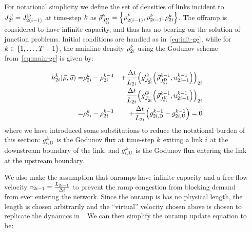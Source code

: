 			For notational simplicity we define the set of densities of links
			incident to $\jup{2\link}=\jdown{2\left(\link-1\right)}$ at time-step
			$k$ as $\juncstate{\jup{2\link}}{\tind}=\left\{ \discrete{2\left(\link-1\right)}{\tind},\discrete{2i-1}{\tind},\discrete{2\link}{\tind}\right\} $.
			The offramp is considered to have infinite capacity, and thus has
			no bearing on the solution of junction problems. Initial conditions
			are handled as in~\eqref{eq:init-ge}, while for $k\in\intrange 1{\ntime-1}$,
			the mainline density $\rho_{2i}^{k}$ using the Godunov
			scheme from~\eqref{eq:main-ge} is given by:
						
			\begin{eqnarray}
				\syseq_{2\link}^{\tind}(\state,\control)= & \discrete{2\link}{\tind}-\discrete{2\link}{\tind-1} & +\dfrac{\Delta t}{\length_{2\link}}\left(\god_{\jdown{2\link}}\left(\juncstate{\jdown{2\link}}{\tind-1},\ramp_{2\link+1}^{\tind-1}\right)\right)_{2\link}\label{eq:rho-update}\\
				&  & -\dfrac{\Delta t}{\length_{2\link}}\left(\god_{\jup{2\link}}\left(\juncstate{\jup{2\link}}{\tind-1},\ramp_{2\link-1}^{\tind-1}\right)\right)_{2\link}\nonumber \\
				= & \discrete{2\link}{\tind}-\discrete{2\link}{\tind-1} & +\frac{\Delta t}{\length_{2\link}}\left(\fout{2\link}{\tind-1}-\fin{2\link}{\tind-1}\right)=0
			\end{eqnarray}
			where we have introduced some substitutions to reduce the notational
			burden of this section: $g_{i,\text{D}}^{k}$ is the Godunov flux
			at time-step $k$ exiting a link $i$ at the downstream boundary
			of the link, and $g_{i,\text{U}}^{k}$ is the Godunov flux entering
			the link at the upstream boundary.
						
			We also make the assumption that onramps have infinite capacity and
			a free-flow velocity $v_{2i-1}=\frac{L_{2i-1}}{\Delta t}$
			to prevent the ramp congestion from blocking demand from ever entering
			the network. Since the onramp is has no physical length, the length
			is chosen arbitrarily and the ``virtual'' velocity chosen above
			is chosen to replicate the dynamics in~\cite{Monache2013}. We can
			then simplify the onramp update equation to be:
						
